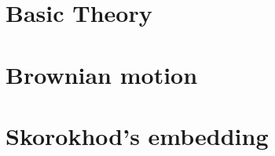 

%
%
\section{Basic Theory}




%
%
\section{Brownian motion}


%
%
\section{Skorokhod's embedding}
